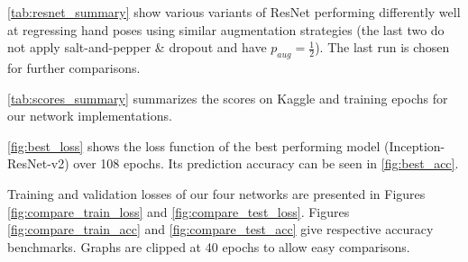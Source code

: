 \autoref{tab:resnet_summary} show various variants of ResNet performing differently well at regressing hand poses using similar augmentation strategies (the last two do not apply salt-and-pepper \& dropout and have $p_{aug} = \tfrac{1}{2}$). The last run is chosen for further comparisons.

\autoref{tab:scores_summary} summarizes the scores on Kaggle and training epochs for our network implementations.

\autoref{fig:best_loss} shows the loss function of the best performing model (Inception-ResNet-v2) over 108 epochs. Its prediction accuracy can be seen in \autoref{fig:best_acc}.

Training and validation losses of our four networks are presented in Figures \ref{fig:compare_train_loss} and \ref{fig:compare_test_loss}. Figures \ref{fig:compare_train_acc} and \ref{fig:compare_test_acc} give respective accuracy benchmarks. Graphs are clipped at 40 epochs to allow easy comparisons.

